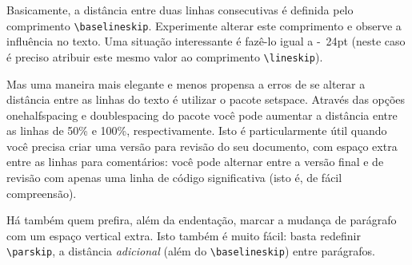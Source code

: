 \documentclass[a4paper,12pt]{article}
\newcommand{\pacote}[1]{{\color{orange!50!black}\normalfont #1}}
\newcommand{\opcao}[1]{{\color{red!50!black}\normalfont #1}}
\begin{document}
	
	
	Basicamente, a distância entre duas linhas consecutivas é definida pelo comprimento \verb|\baselineskip|. Experimente alterar este comprimento e observe a influência no texto. Uma situação interessante é fazê-lo igual a \unit{-24}{pt} (neste caso é preciso atribuir este mesmo valor ao comprimento \verb|\lineskip|).
	
	
	Mas uma maneira mais elegante e menos propensa a erros de se alterar a distância entre as linhas do texto é utilizar o pacote \pacote{setspace}. Através das opções \opcao{onehalfspacing} e \opcao{doublespacing} do pacote você pode aumentar a distância entre as linhas de 50\% e 100\%, respectivamente. Isto é particularmente útil quando você precisa criar uma versão para revisão do seu documento, com espaço extra entre as linhas para comentários: você pode alternar entre a versão final e de revisão com apenas uma linha de código significativa (isto é, de fácil compreensão).
	
	
	Há também quem prefira, além da endentação, marcar a mudança de parágrafo com um espaço vertical extra. Isto também é muito fácil: basta redefinir \verb|\parskip|, a distância \emph{adicional} (além do \verb|\baselineskip|) entre parágrafos.
	
\end{document}
